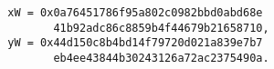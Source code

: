 \begin{verbatim}
        xW = 0x0a76451786f95a802c0982bbd0abd68e
               41b92adc86c8859b4f44679b21658710,
        yW = 0x44d150c8b4bd14f79720d021a839e7b7
               eb4ee43844b30243126a72ac2375490a.
\end{verbatim}
